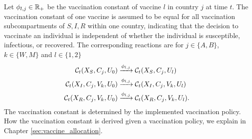 Let $\phi_{l,j} \in \mathbb{R}_+$ be the vaccination constant of vaccine $l$ in country $j$ at time $t$. The vaccination constant of one vaccine is assumed to be equal for all vaccination subcompartments of $S, I,R$ within one country, indicating that the decision to vaccinate an individual is independent of whether the individual is susceptible, infectious, or recovered.  The corresponding reactions are for $j \in \{A,B\}$, $k \in \{W,M\}$ and $l \in \{1,2\}$
\begin{align}
\mathcal{C}_t(X_S, C_j, U_0) &\xrightarrow{\phi_{l, j}} \mathcal{C}_t(X_S, C_j, U_l)  \\
\mathcal{C}_t(X_I, C_j, V_k, U_0) &\xrightarrow{\phi_{l,j}} \mathcal{C}_t(X_I, C_j, V_k, U_l) \notag \\
\mathcal{C}_t(X_R, C_j, V_k, U_0) &\xrightarrow{\phi_{l,j}} \mathcal{C}_t(X_R, C_j, V_k, U_l). \notag
\end{align}
The vaccination constant is determined by the implemented vaccination policy. How the vaccination constant is derived given a vaccination policy, we explain in Chapter \ref{sec:vaccine_allocation}.


